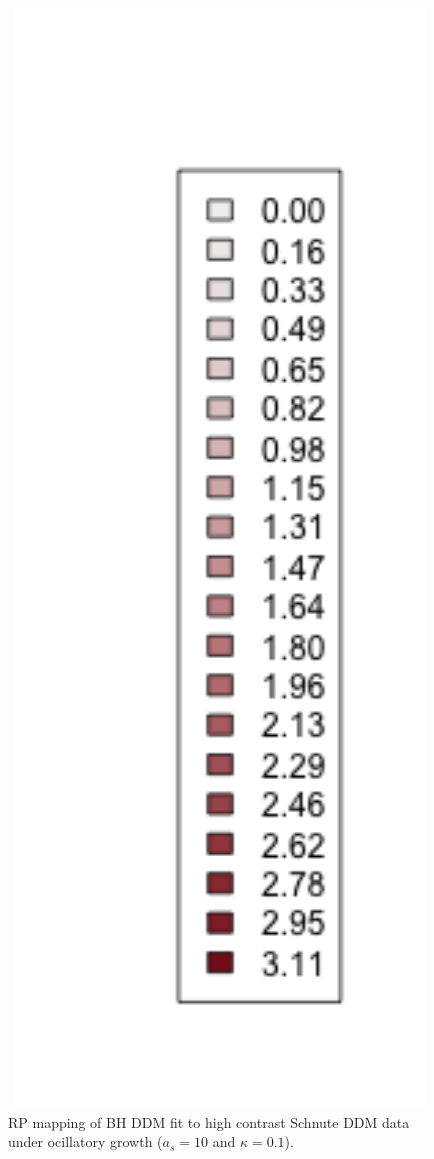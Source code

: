 \begin{figure}
\begin{minipage}[h!]{0.06\textwidth}
\includegraphics[width=1.7\textwidth]{../gpBias/legendSubSchnute.png}
\end{minipage}

\vspace{-0.75cm}
\caption{RP mapping of BH DDM fit to high contrast Schnute DDM data under ocillatory growth ($a_s=10$ and $\kappa=0.1$).
}\label{oscillationArrow}
\end{figure}

